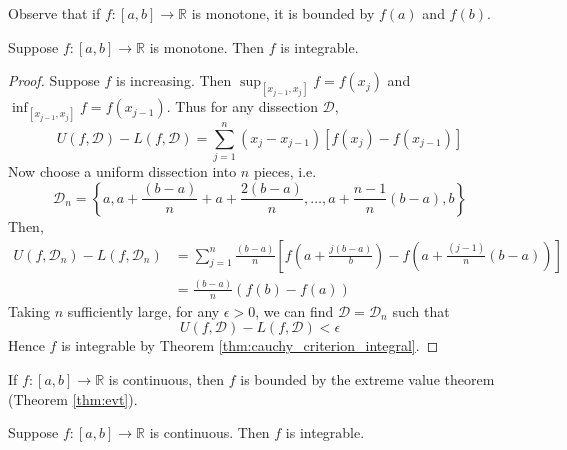 \documentclass[10pt, a4paper, twoside]{report}
\begin{document}
Observe that if \(f:[a,b]\to\mathbb{R}\) is monotone, it is bounded by \(f(a)\) and \(f(b)\).
\begin{theorem}
    Suppose \(f:[a,b]\to\mathbb{R}\) is monotone. Then \(f\) is integrable.
    \label{thm:int_monotone}
\end{theorem}
\begin{proof}
    Suppose \(f\) is increasing. Then \(\sup_{[x_{j-1},x_j]}f=f(x_j)\) and \(\inf_{[x_{j-1},x_j]}f=f(x_{j-1})\). Thus for any dissection \(\mathcal{D}\), 
    \[U(f,\mathcal{D})-L(f,\mathcal{D})=\sum_{j=1}^{n}(x_j-x_{j-1})[f(x_j)-f(x_{j-1})]\]
    Now choose a uniform dissection into \(n\) pieces, i.e. 
    \[\mathcal{D}_n=\left\{a,a+\frac{(b-a)}{n}+a+\frac{2(b-a)}{n},\ldots,a+\frac{n-1}{n}(b-a),b\right\}\]
    Then,
    \begin{align*}
        U(f,\mathcal{D}_n)-L(f,\mathcal{D}_n)&=\sum_{j=1}^{n}\frac{(b-a)}{n}\left[f\left(a+\frac{j(b-a)}{b}\right)-f\left(a+\frac{(j-1)}{n}(b-a)\right)\right]\\&=\frac{(b-a)}{n}(f(b)-f(a))        
    \end{align*}
    Taking \(n\) sufficiently large, for any \(\epsilon>0\), we can find \(\mathcal{D}=\mathcal{D}_n\) such that 
    \[U(f,\mathcal{D})-L(f,\mathcal{D})<\epsilon\]
    Hence \(f\) is integrable by Theorem \ref{thm:cauchy_criterion_integral}.
\end{proof}
If \(f:[a,b]\to\mathbb{R}\) is continuous, then \(f\) is bounded by the extreme value theorem (Theorem \ref{thm:evt}).
\begin{theorem}
    Suppose \(f:[a,b]\to\mathbb{R}\) is continuous. Then \(f\) is integrable.
    \label{thm:int_cont}
\end{theorem}
\end{document}
